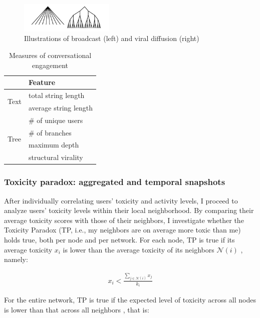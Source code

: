 \documentclass[10pt,twocolumn,letterpaper]{article}
\begin{document}
\begin{figure}
  \centering
  \includegraphics[width=0.4\textwidth]{figures/structural-virality.png}
  \caption{Illustrations of broadcast (left) and viral diffusion (right) \cite{goel2016structural}}
  \label{fig:structural-virality}
\end{figure}


\begin{table}[]
\centering
\begin{tabular}{l|l}
                      & Feature               \\ \hline
\multirow{2}{*}{Text} & total string length   \\
                      & average string length \\ \hline
\multirow{4}{*}{Tree} & \# of unique users    \\
                      & \# of branches        \\
                      & maximum depth         \\
                      & structural virality 
\end{tabular}
\caption{Measures of conversational engagement}
\label{tab:engagement-measure}
\end{table}


\subsubsection{Toxicity paradox: aggregated and temporal snapshots}

After individually correlating users' toxicity and activity levels, I proceed to analyze users' toxicity levels within their local neighborhood. By comparing their average toxicity scores with those of their neighbors, I investigate whether the Toxicity Paradox (TP, i.e., my neighbors are on average more toxic than me) holds true, both per node and per network. For each node, TP is true if its average toxicity $x_i$ is lower than the average toxicity of its neighbors $\mathcal{N}(i)$ \cite{eom2014generalized}, namely: 

\begin{align*}
x_i < \frac{\sum_{j \in \mathcal{N}(i)}x_j}{k_i}	
\end{align*}

For the entire network, TP is true if the expected level of toxicity across all nodes is lower than that across all neighbors \cite{eom2014generalized}, that is:
\end{document}

